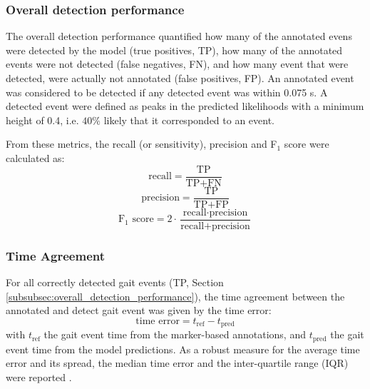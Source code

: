 \documentclass[sensors,article,submit,pdftex,moreauthors]{Definitions/mdpi}
\begin{document}
\subsubsection{Overall detection performance \label{subsubsec:overall_detection_performance}}
The overall detection performance quantified how many of the annotated evens were detected by the model (true positives, TP), how many of the annotated events were not detected (false negatives, FN), and how many event that were detected, were actually not annotated (false positives, FP). An annotated event was considered to be detected if any detected event was within 0.075 s. A detected event were defined as peaks in the predicted likelihoods with a minimum height of 0.4, i.e. $40\%$ likely that it corresponded to an event. 

From these metrics, the recall (or sensitivity), precision and F$_{1}$ score were calculated as:
\begin{equation}
	\textrm{recall} = \frac{\textrm{TP}}{\textrm{TP} + \textrm{FN}} \nonumber
	\label{eqn:recall}
\end{equation}
\begin{equation}
	\textrm{precision} = \frac{\textrm{TP}}{\textrm{TP} + \textrm{FP}} \nonumber
	\label{eqn:precision}
\end{equation}
\begin{equation}
	\textrm{F$_{1}$ score} = 2 \cdot \frac{\textrm{recall} \cdot \textrm{precision}}{\textrm{recall} + \textrm{precision}}  \nonumber
	\label{eqn:f1_score}
\end{equation}

\subsubsection{Time Agreement \label{subsubsec:Methods_Time_Agreement}}
For all correctly detected gait events (TP, Section \ref{subsubsec:overall_detection_performance}), the time agreement between the annotated and detect gait event was given by the time error:
\begin{equation}
	\textrm{time error} = t_{\textrm{ref}} - t_{\textrm{pred}}
	\label{eqn:time_agreement}
\end{equation}
with $t_{\mathrm{ref}}$ the gait event time from the marker-based annotations, and $t_{\mathrm{pred}}$ the gait event time from the model predictions. As a robust measure for the average time error and its spread, the median time error and the inter-quartile range (IQR) were reported \cite{OpenIntro2019}.
\end{document}
